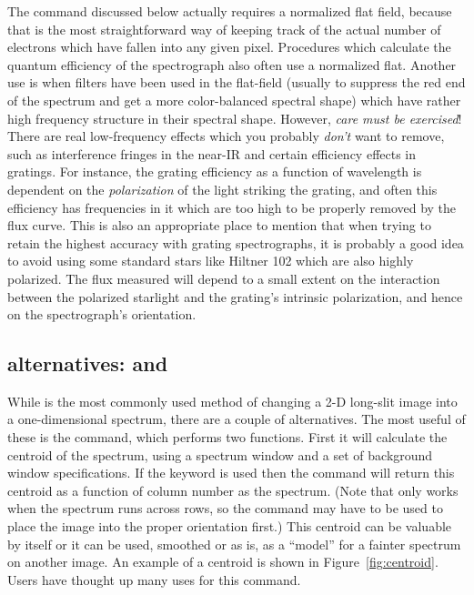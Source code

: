 The  command discussed below actually requires a normalized flat
field, because that is the most straightforward way of keeping track of the
actual number of electrons which have fallen into any given pixel. Procedures
which calculate the quantum efficiency of the spectrograph also often use a
normalized flat.  Another use is when filters have been used in the flat-field
(usually to suppress the red end of the spectrum and get a more color-balanced
spectral shape) which have rather high frequency structure in their spectral
shape.  However, {\it care must be exercised}! There are real low-frequency
effects which you probably {\it don't} want to remove, such as interference
fringes in the near-IR and certain efficiency effects in gratings. For
instance, the grating efficiency as a function of wavelength is dependent on
the {\it polarization} of the light striking the grating, and often this
efficiency has frequencies in it which are too high to be properly removed by
the flux curve.  This is also an appropriate place to mention that when trying
to retain the highest accuracy with grating spectrographs, it is probably a
good idea to avoid using some standard stars like Hiltner 102 which are also
highly polarized.  The flux measured will depend to a small extent on the
interaction between the polarized starlight and the grating's intrinsic
polarization, and hence on the spectrograph's orientation.

\subsection{ alternatives:  and }

While  is the most commonly used method of changing a 2-D long-slit
image into a one-dimensional spectrum, there are a couple of alternatives.
The most useful of these is the  command, which performs two
functions.  First it will calculate the centroid of the spectrum, using a
spectrum window and a set of background window specifications.  If the
 keyword is used then the command will return this centroid as a
function of column number as the spectrum.  (Note that  only
works when the spectrum runs across rows, so the  command may
have to be used to place the image into the proper orientation first.)  This
centroid can be valuable by itself or it can be used, smoothed or as is, as a
``model'' for a fainter spectrum on another image. An example of a centroid is
shown in Figure~\ref{fig:centroid}.  Users have thought up many uses for this
command.


